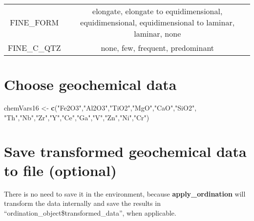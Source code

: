 \documentclass[12pt,]{book}
\newenvironment{Shaded}{\begin{snugshade}}{\end{snugshade}}
\newcommand{\KeywordTok}[1]{\textcolor[rgb]{0.13,0.29,0.53}{\textbf{#1}}}
\newcommand{\NormalTok}[1]{#1}
\newcommand{\StringTok}[1]{\textcolor[rgb]{0.31,0.60,0.02}{#1}}
\begin{document}
\begin{longtable}[]{@{}cc@{}}
\begin{minipage}[t]{0.22\columnwidth}\centering
FINE\_FORM\strut
\end{minipage} & \begin{minipage}[t]{0.43\columnwidth}\centering
elongate, elongate to
equidimensional,
equidimensional,
equidimensional to laminar,
laminar, none\strut
\end{minipage}\tabularnewline
\begin{minipage}[t]{0.22\columnwidth}\centering
FINE\_C\_QTZ\strut
\end{minipage} & \begin{minipage}[t]{0.43\columnwidth}\centering
none, few, frequent,
predominant\strut
\end{minipage}\tabularnewline
\bottomrule
\end{longtable}

\hypertarget{choose-geochemical-data}{%
\section{Choose geochemical data}\label{choose-geochemical-data}}

\begin{Shaded}
\begin{Highlighting}[]
\NormalTok{chemVars16 <-}\StringTok{ }\KeywordTok{c}\NormalTok{(}\StringTok{"Fe2O3"}\NormalTok{,}\StringTok{"Al2O3"}\NormalTok{,}\StringTok{"TiO2"}\NormalTok{,}\StringTok{"MgO"}\NormalTok{,}\StringTok{"CaO"}\NormalTok{,}\StringTok{"SiO2"}\NormalTok{,}
                \StringTok{"Th"}\NormalTok{,}\StringTok{"Nb"}\NormalTok{,}\StringTok{"Zr"}\NormalTok{,}\StringTok{"Y"}\NormalTok{,}\StringTok{"Ce"}\NormalTok{,}\StringTok{"Ga"}\NormalTok{,}\StringTok{"V"}\NormalTok{,}\StringTok{"Zn"}\NormalTok{,}\StringTok{"Ni"}\NormalTok{,}\StringTok{"Cr"}\NormalTok{)}
\end{Highlighting}
\end{Shaded}

\hypertarget{save-transformed-geochemical-data-to-file-optional}{%
\section{Save transformed geochemical data to file (optional)}\label{save-transformed-geochemical-data-to-file-optional}}

There is no need to save it in the environment, because \textbf{apply\_ordination} will transform
the data internally and save the results in ``ordination\_object\$transformed\_data'',
when applicable.
\end{document}
